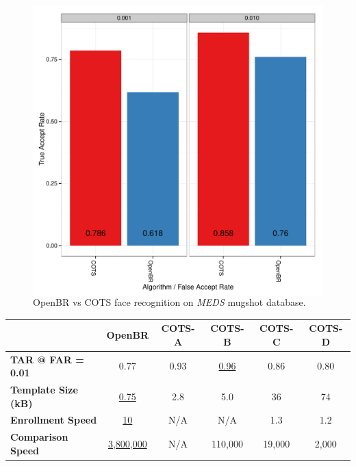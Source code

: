 \documentclass[12pt]{beamer}
\begin{document}
\begin{frame}
\begin{figure}
\begin{columns}
    \includegraphics[width=\textwidth]{img/MEDS/MEDS_BC}
\end{columns}
\caption{OpenBR vs COTS face recognition on \emph{MEDS} mugshot database.}
\end{figure}
\vspace{-20pt}
\pause
{\footnotesize
\hskip-10pt
\begin{tabular}{l | c | c | c | c | c}
 & \textbf{OpenBR} & \textbf{COTS-A} & \textbf{COTS-B} & \textbf{COTS-C} & \textbf{COTS-D} \\
\hline
\textbf{TAR @ FAR = 0.01} & 0.77 & 0.93 & \underline{0.96} & 0.86 & 0.80 \\
\textbf{Template Size (kB)} & \underline{0.75} & 2.8 & 5.0 & 36 & 74 \\
\textbf{Enrollment Speed} & \underline{10} & N/A & N/A & 1.3 & 1.2 \\
\textbf{Comparison Speed} & \underline{3,800,000} & N/A & 110,000 & 19,000 & 2,000 \\
 \end{tabular}
}
\end{frame}
\end{document}
